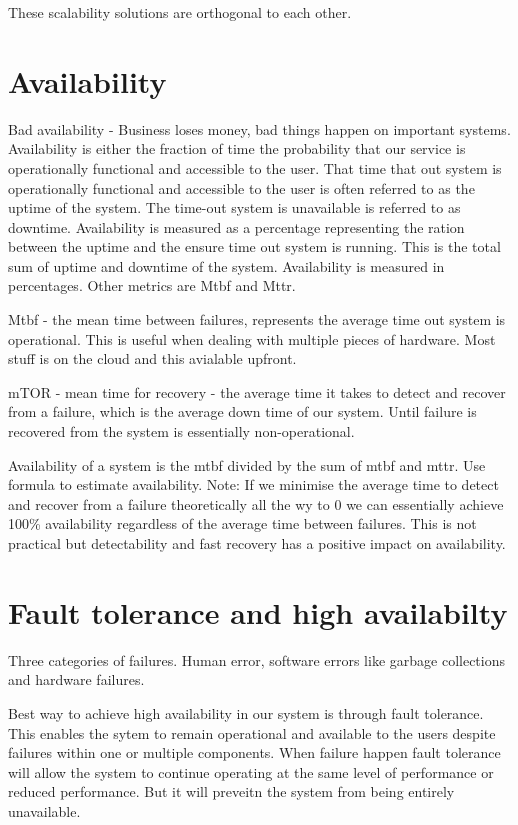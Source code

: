 \documentclass[a4paper, 11pt]{book}
\begin{document}
    These scalability solutions are orthogonal to each other.


    \section{Availability}
    Bad availability - Business loses money, bad things happen on important systems.
    Availability is either the fraction of time the probability that our service is operationally functional and accessible to the user.
    That time that out system is operationally functional and accessible to the user is often referred to as the uptime of the system.
    The time-out system is unavailable is referred to as downtime.
    Availability is measured as a percentage representing the ration between the uptime and the ensure time out system is running.
    This is the total sum of uptime and downtime of the system.
    Availability is measured in percentages.
    Other metrics are Mtbf and Mttr.

    Mtbf - the mean time between failures, represents the average time out system is operational.
    This is useful when dealing with multiple pieces of hardware. Most stuff is on the cloud and this avialable upfront.

    mTOR - mean time for recovery - the average time it takes to detect and recover from a failure, which is the average down time of our system.
    Until failure is recovered from the system is essentially non-operational.

    Availability of a system is the mtbf divided by the sum of mtbf and mttr.
    Use formula to estimate availability.
    Note: If we minimise the average time to detect and recover from a failure theoretically all the wy to 0 we can essentially achieve 100\%
    availability regardless of the average time between failures.
    This is not practical but detectability and fast recovery has a positive impact on availability.


    \section{Fault tolerance and high availabilty}
    Three categories of failures.
    Human error, software errors like garbage collections and hardware failures.

    Best way to achieve high availability in our system is through fault tolerance.
    This enables the sytem to remain operational and available to the users despite failures within one or multiple components.
    When failure happen fault tolerance will allow the system to continue operating at the same level of performance or reduced performance.
    But it will preveitn the system from being entirely unavailable.
\end{document}
